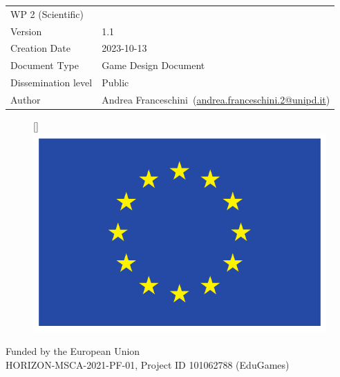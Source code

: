 \documentclass[a4paper,11pt]{article}
\title{\documenttitle}
\author{\documentauthor}
\makeatletter
\def\documentauthor{Andrea Franceschini}
\def\documentversion{1.1}
\def\documentdate{2023-10-13}
\renewcommand{\maketitle}{\bgroup\setlength{\parindent}{0pt}
\begin{flushleft}
	\sffamily\LARGE\@title
\end{flushleft}\egroup
}
\makeatother
\begin{document}
\maketitle\vspace{\baselineskip}

\begin{table}[h!]
  \begin{tabular}{@{}ll}
  WP 2 (Scientific)   &                                                      \\
  Version             & \documentversion                                     \\
  Creation Date       & \documentdate                                        \\
  Document Type    & Game Design Document                                 \\
  Dissemination level & Public                                               \\
  Author              & \documentauthor\ (\href{mailto:andrea.franceschini.2@unipd.it}{andrea.franceschini.2@unipd.it})
  \end{tabular}
\end{table}

\begin{figure}
  \raisebox{0pt}[\dimexpr{}\baselineskip\relax]{\includegraphics[height=2\baselineskip]{figures/eu_flag.pdf}}
\end{figure}

\noindent Funded by the European Union\\ HORIZON-MSCA-2021-PF-01, Project ID 101062788 (EduGames)

\doclicenseThis
\vspace{2\baselineskip}
\end{document}
